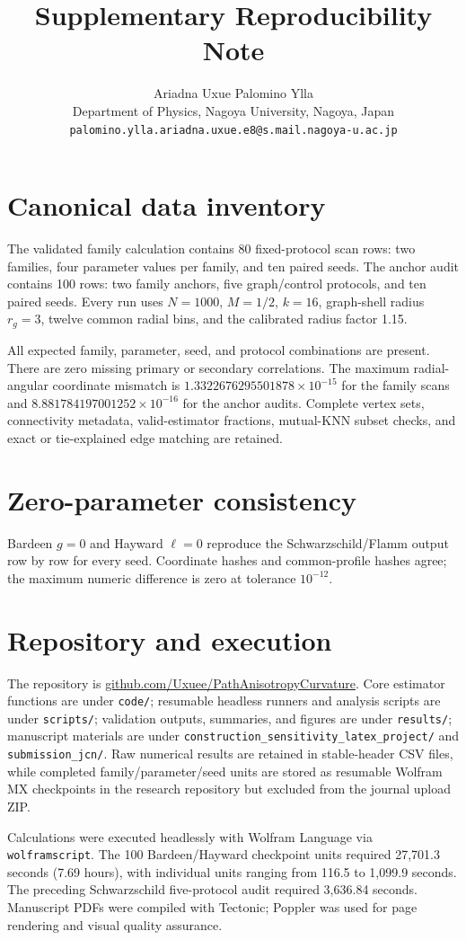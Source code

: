 \documentclass[11pt]{article}
\title{Supplementary Reproducibility Note}
\author{Ariadna Uxue Palomino Ylla\\
Department of Physics, Nagoya University, Nagoya, Japan\\
\texttt{palomino.ylla.ariadna.uxue.e8@s.mail.nagoya-u.ac.jp}}
\date{}
\begin{document}
\maketitle

\section{Canonical data inventory}

The validated family calculation contains 80 fixed-protocol scan rows: two
families, four parameter values per family, and ten paired seeds. The anchor
audit contains 100 rows: two family anchors, five graph/control protocols, and
ten paired seeds. Every run uses $N=1000$, $M=1/2$, $k=16$, graph-shell radius
$r_g=3$, twelve common radial bins, and the calibrated radius factor 1.15.

All expected family, parameter, seed, and protocol combinations are present.
There are zero missing primary or secondary correlations. The maximum
radial-angular coordinate mismatch is $1.3322676295501878\times10^{-15}$ for
the family scans and $8.881784197001252\times10^{-16}$ for the anchor audits.
Complete vertex sets, connectivity metadata, valid-estimator fractions,
mutual-KNN subset checks, and exact or tie-explained edge matching are retained.

\section{Zero-parameter consistency}

Bardeen $g=0$ and Hayward $\ell=0$ reproduce the Schwarzschild/Flamm output
row by row for every seed. Coordinate hashes and common-profile hashes agree;
the maximum numeric difference is zero at tolerance $10^{-12}$.

\section{Repository and execution}

The repository is
\href{https://github.com/Uxuee/PathAnisotropyCurvature}{github.com/Uxuee/PathAnisotropyCurvature}.
Core estimator functions are under \texttt{code/}; resumable headless runners
and analysis scripts are under \texttt{scripts/}; validation outputs, summaries,
and figures are under \texttt{results/}; manuscript materials are under
\texttt{construction\_sensitivity\_latex\_project/} and
\texttt{submission\_jcn/}. Raw numerical results are retained in stable-header
CSV files, while completed family/parameter/seed units are stored as resumable
Wolfram MX checkpoints in the research repository but excluded from the journal
upload ZIP.

Calculations were executed headlessly with Wolfram Language via
\texttt{wolframscript}. The 100 Bardeen/Hayward checkpoint units required
27,701.3 seconds (7.69 hours), with individual units ranging from 116.5 to
1,099.9 seconds. The preceding Schwarzschild five-protocol audit required
3,636.84 seconds. Manuscript PDFs were compiled with Tectonic; Poppler was used
for page rendering and visual quality assurance.
\end{document}
